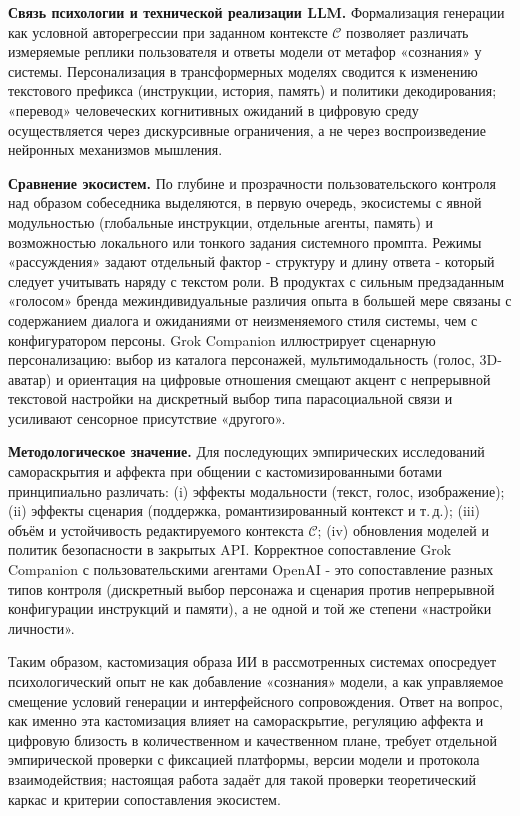 \documentclass[areasetadvanced]{scrartcl}
\begin{document}
  \textbf{Связь психологии и технической реализации LLM.} Формализация генерации как условной авторегрессии при заданном контексте $\mathcal{C}$ позволяет различать измеряемые реплики пользователя и ответы модели от метафор «сознания» у системы. Персонализация в трансформерных моделях сводится к изменению текстового префикса (инструкции, история, память) и политики декодирования; «перевод» человеческих когнитивных ожиданий в цифровую среду осуществляется через дискурсивные ограничения, а не через воспроизведение нейронных механизмов мышления.

  \textbf{Сравнение экосистем.} По глубине и прозрачности пользовательского контроля над образом собеседника выделяются, в первую очередь, экосистемы с явной модульностью (глобальные инструкции, отдельные агенты, память) и возможностью локального или тонкого задания системного промпта. Режимы «рассуждения» задают отдельный фактор - структуру и длину ответа - который следует учитывать наряду с текстом роли. В продуктах с сильным предзаданным «голосом» бренда межиндивидуальные различия опыта в большей мере связаны с содержанием диалога и ожиданиями от неизменяемого стиля системы, чем с конфигуратором персоны. Grok Companion иллюстрирует сценарную персонализацию: выбор из каталога персонажей, мультимодальность (голос, 3D-аватар) и ориентация на цифровые отношения смещают акцент с непрерывной текстовой настройки на дискретный выбор типа парасоциальной связи и усиливают сенсорное присутствие «другого».

  \textbf{Методологическое значение.} Для последующих эмпирических исследований самораскрытия и аффекта при общении с кастомизированными ботами принципиально различать: (i) эффекты модальности (текст, голос, изображение); (ii) эффекты сценария (поддержка, романтизированный контекст и т.\,д.); (iii) объём и устойчивость редактируемого контекста $\mathcal{C}$; (iv) обновления моделей и политик безопасности в закрытых API. Корректное сопоставление Grok Companion с пользовательскими агентами OpenAI - это сопоставление разных типов контроля (дискретный выбор персонажа и сценария против непрерывной конфигурации инструкций и памяти), а не одной и той же степени «настройки личности».

  Таким образом, кастомизация образа ИИ в рассмотренных системах опосредует психологический опыт не как добавление «сознания» модели, а как управляемое смещение условий генерации и интерфейсного сопровождения. Ответ на вопрос, как именно эта кастомизация влияет на самораскрытие, регуляцию аффекта и цифровую близость в количественном и качественном плане, требует отдельной эмпирической проверки с фиксацией платформы, версии модели и протокола взаимодействия; настоящая работа задаёт для такой проверки теоретический каркас и критерии сопоставления экосистем.
\end{document}
